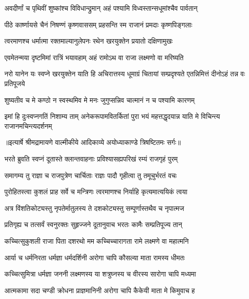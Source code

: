 \twolineshloka
{अवदीर्णां च पृथिवीं शुष्कांश्च विविधान्द्रुमान्}
{अहं पश्यामि विध्वस्तान्सधूमांश्चैव पार्वतान्} %

\twolineshloka
{पीठे कार्ष्णायसे चैनं निषण्णं कृष्णवाससम्}
{प्रहसन्ति स्म राजानं प्रमदाः कृष्णपिङ्गलाः} %

\twolineshloka
{त्वरमाणश्च धर्मात्मा रक्तमाल्यानुलेपनः}
{रथेन खरयुक्तेन प्रयातो दक्षिणामुखः} %

\twolineshloka
{एवमेतन्मया दृष्टमिमां रात्रिं भयावहाम्}
{अहं रामोऽथ वा राजा लक्ष्मणो वा मरिष्यति} %

\threelineshloka
{नरो यानेन यः स्वप्ने खरयुक्तेन याति हि}
{अचिरात्तस्य धूमाग्रं चितायां सम्प्रदृश्यते}
{एतन्निमित्तं दीनोऽहं तन्न वः प्रतिपूजये} %

\twolineshloka
{शुष्यतीव च मे कण्ठो न स्वस्थमिव मे मनः}
{जुगुप्सन्निव चात्मानं न च पश्यामि कारणम्} %

\fourlineindentedshloka
{इमां हि दुःस्वप्नगतिं निशाम्य ताम्}
{अनेकरूपामवितर्कितां पुरा}
{भयं महत्तद्धृदयान्न याति मे}
{विचिन्त्य राजानमचिन्त्यदर्शनम्} %


{॥इत्यार्षे श्रीमद्रामायणे वाल्मीकीये आदिकाव्ये अयोध्याकाण्डे त्रिषष्टितमः सर्गः॥}


\twolineshloka
{भरते ब्रुवति स्वप्नं दूतास्ते क्लान्तवाहनाः}
{प्रविश्यासह्यपरिखं रम्यं राजगृहं पुरम्} %

\twolineshloka
{समागम्य तु राज्ञा च राजपुत्रेण चार्चिताः}
{राज्ञः पादौ गृहीत्वा तु तमूचुर्भरतं वचः} %

\twolineshloka
{पुरोहितस्त्वा कुशलं प्राह सर्वे च मन्त्रिणः}
{त्वरमाणश्च निर्याहि कृत्यमात्ययिकं त्वया} %

\twolineshloka
{अत्र विंशतिकोट्यस्तु नृपतेर्मातुलस्य ते}
{दशकोट्यस्तु सम्पूर्णास्तथैव च नृपात्मज} %

\twolineshloka
{प्रतिगृह्य च तत्सर्वं स्वनुरक्तः सुहृज्जने}
{दूतानुवाच भरतः कामैः सम्प्रतिपूज्य तान्} %

\twolineshloka
{कच्चित्सुकुशली राजा पिता दशरथो मम}
{कच्चिच्चारागता रामे लक्ष्मणे वा महात्मनि} %

\twolineshloka
{आर्या च धर्मनिरता धर्मज्ञा धर्मदर्शिनी}
{अरोगा चापि कौसल्या माता रामस्य धीमतः} %

\twolineshloka
{कच्चित्सुमित्रा धर्मज्ञा जननी लक्ष्मणस्य या}
{शत्रुघ्नस्य च वीरस्य सारोगा चापि मध्यमा} %

\twolineshloka
{आत्मकामा सदा चण्डी क्रोधना प्राज्ञमानिनी}
{अरोगा चापि कैकेयी माता मे किमुवाच ह} %

